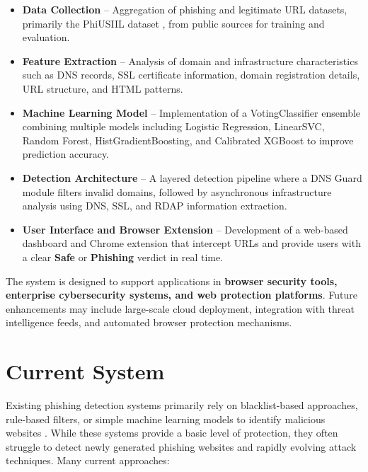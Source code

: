 \begin{itemize}
\item \textbf{Data Collection} -- Aggregation of phishing and legitimate URL datasets, primarily the PhiUSIIL dataset \cite{ref5}, from public sources for training and evaluation.

\item \textbf{Feature Extraction} -- Analysis of domain and infrastructure characteristics such as DNS records, SSL certificate information, domain registration details, URL structure, and HTML patterns.

\item \textbf{Machine Learning Model} -- Implementation of a VotingClassifier ensemble combining multiple models including Logistic Regression, LinearSVC, Random Forest, HistGradientBoosting, and Calibrated XGBoost to improve prediction accuracy.

\item \textbf{Detection Architecture} -- A layered detection pipeline where a DNS Guard module filters invalid domains, followed by asynchronous infrastructure analysis using DNS, SSL, and RDAP information extraction.

\item \textbf{User Interface and Browser Extension} -- Development of a web-based dashboard and Chrome extension that intercept URLs and provide users with a clear \textbf{Safe} or \textbf{Phishing} verdict in real time.
\end{itemize}

The system is designed to support applications in \textbf{browser security tools, enterprise cybersecurity systems, and web protection platforms}. Future enhancements may include large-scale cloud deployment, integration with threat intelligence feeds, and automated browser protection mechanisms.

\section{Current System}

Existing phishing detection systems primarily rely on blacklist-based approaches, rule-based filters, or simple machine learning models to identify malicious websites \cite{ref6, ref7, ref19, ref20, ref21}. While these systems provide a basic level of protection, they often struggle to detect newly generated phishing websites and rapidly evolving attack techniques.
Many current approaches:

